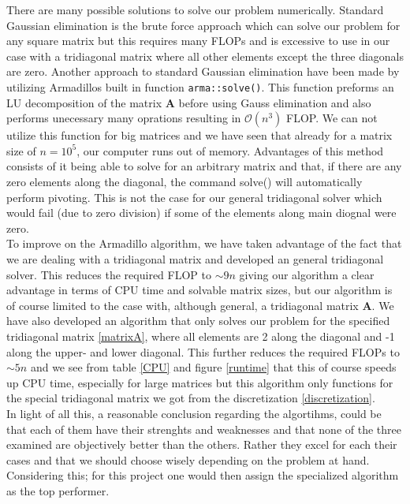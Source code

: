 \documentclass[12pt]{article}
\numberwithin{figure}{section}
\numberwithin{table}{section}
\begin{document}
\noindent There are many possible solutions to solve our problem numerically. Standard Gaussian elimination is the brute force approach which can solve our problem for any square matrix but this requires many FLOPs and is excessive to use in our case with a tridiagonal matrix where all other elements except the three diagonals are zero. Another approach to standard Gaussian elimination have been made by utilizing Armadillos built in function \texttt{arma::solve()}. This function preforms an LU decomposition of the matrix $\mathbf{A}$ before using Gauss elimination and also performs unecessary many oprations resulting in $\mathcal{O}(n^3)$ FLOP. We can not utilize this function for big matrices and we have seen that already for a matrix size of $n=10^5$, our computer runs out of memory. Advantages of this method consists of it being able to solve for an arbitrary matrix and that, if there are any zero elements along the diagonal, the command solve() will automatically perform pivoting. This is not the case for our general tridiagonal solver which would fail (due to zero division) if some of the elements along main diognal were zero. \\

\noindent To improve on the Armadillo algorithm, we have taken advantage of the fact that we are dealing with a tridiagonal matrix and developed an general tridiagonal solver. This reduces the required FLOP to $\sim 9n$ giving our algorithm a clear advantage in terms of CPU time and solvable matrix sizes, but our algorithm is of course limited to the case with, although general, a tridiagonal matrix $\mathbf{A}$. We have also developed an algorithm that only solves our problem for the specified tridiagonal matrix \eqref{matrixA}, where all elements are 2 along the diagonal and -1 along the upper- and lower diagonal. This further reduces the required FLOPs to $\sim 5n$ and we see from table \ref{CPU} and figure \ref{runtime} that this of course speeds up CPU time, especially for large matrices but this algorithm only functions for the special tridiagonal matrix we got from the discretization \eqref{discretization}. \\

\noindent In light of all this, a reasonable conclusion regarding the algortihms, could be that each of them have their strenghts and weaknesses and that none of the three examined are objectively better than the others. Rather they excel for each their cases and that we should choose wisely depending on the problem at hand. Considering this; for this project one would then assign the specialized algorithm as the top performer. \\
\end{document}
